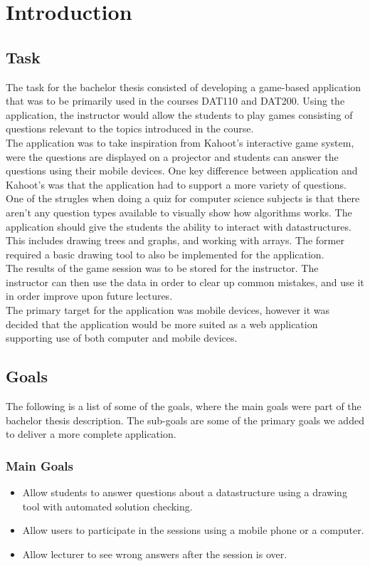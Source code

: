 \section{Introduction}
\subsection{Task}
The task for the bachelor thesis consisted of developing a game-based application that was to be primarily used in the courses DAT110 and DAT200. Using the application, the instructor would allow the students to play games consisting of questions relevant to the topics introduced in the course.
\\[11pt]
The application was to take inspiration from Kahoot's interactive game system\cite{Kahoot}, were the questions are displayed on a projector and students can answer the questions using their mobile devices. One key difference between application and Kahoot's was that the application had to support a more variety of questions. One of the strugles when doing a quiz for computer science subjects is that there aren't any question types available to visually show how algorithms works. The application should give the students the ability to interact with datastructures. This includes drawing trees and graphs, and working with arrays. The former required a basic drawing tool to also be implemented for the application.
\\[11pt] 
The results of the game session was to be stored for the instructor. The instructor can then use the data in order to clear up common mistakes, and use it in order improve upon future lectures.
\\[11pt]
The primary target for the application was mobile devices, however it was decided that the application would be more suited as a web application supporting use of both computer and mobile devices. 

\subsection{Goals}
The following is a list of some of the goals, where the main goals were part of the bachelor thesis description. The sub-goals are some of the primary goals we added to deliver a more complete application.
\subsubsection{Main Goals}
\begin{itemize}
\item Allow students to answer questions about a datastructure using a drawing tool with automated solution checking.
\item Allow users to participate in the sessions using a mobile phone or a computer.
\item Allow lecturer to see wrong answers after the session is over.
\end{itemize}
